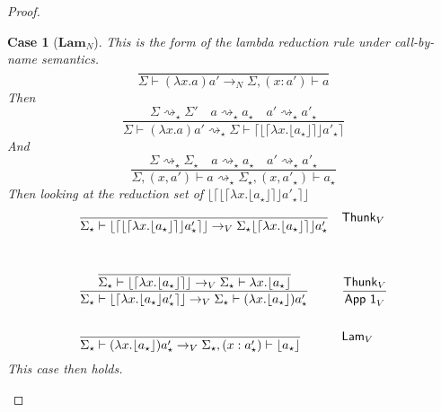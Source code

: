 \documentclass[float=false, crop=false]{standalone}
\newtheorem{case}{Case}
\numberwithin{subcase}{case}
\newcommand{\tlang}{\star}
\newcommand{\thunk}[1]{\lceil #1 \rceil}
\newcommand{\unwrap}[1]{\lfloor #1 \rfloor}
\newcommand{\tcbn}{\rightarrow_N}
\newcommand{\tcbv}{\rightarrow_V}
\newcommand{\tlthunk}{\rightsquigarrow_\tlang}
\begin{document}
\begin{proof}
  \begin{case}[$\mathbf{Lam}_N$]
    This is the form of the lambda reduction rule under call-by-name semantics.
    \[\frac{}{\Sigma \vdash (\lambda x.a)a' \tcbn \Sigma,(x:a') \vdash a }\]
    Then \[ \frac{\Sigma \tlthunk \Sigma' \quad 
        a \tlthunk a_\tlang \quad a' \tlthunk a'_\tlang}
      {\Sigma \vdash (\lambda x .a)a' 
        \tlthunk \Sigma \vdash \thunk{\unwrap{
            \thunk{\lambda x. \unwrap{ a_\tlang}}} a'_\tlang} } \]
    And \[ \frac{\Sigma \tlthunk \Sigma_\tlang \quad a 
        \tlthunk a_\tlang \quad a' \tlthunk a'_\tlang}
      {\Sigma,(x,a') \vdash a\tlthunk \Sigma_\tlang,
        (x,a'_\tlang) \vdash a_\tlang} \]
   Then looking at the reduction set of  
   ${\unwrap{\thunk{\unwrap{
        \thunk{\lambda x. \unwrap{ a_\tlang}}} a'_\tlang}}}$
    \begin{align*}
     &\frac{}{ 
       \Sigma_\tlang \vdash \unwrap{\thunk{\unwrap{\thunk{\lambda x.
               \unwrap{ a_\tlang}}} a'_\tlang}} \tcbv 
       \Sigma_\tlang \unwrap{\thunk{\lambda x.
               \unwrap{ a_\tlang}}} a'_\tlang} && \mathsf{Thunk}_V \\ \\
     &\cfrac{\cfrac{}{\Sigma_\tlang \vdash \unwrap{\thunk{\lambda x.
           \unwrap{ a_\tlang}}} \tcbv  \Sigma_\tlang \vdash \lambda x.
       \unwrap{a_\tlang}}}{ 
       \Sigma_\tlang \vdash \unwrap{\thunk{\lambda x.
               \unwrap{ a_\tlang} a'_\tlang}} \tcbv 
           \Sigma_\tlang \vdash (\lambda x.\unwrap{a_\tlang}) a'_\tlang} && 
         \frac{\mathsf{Thunk}_V}{\mathsf{App\ 1}_V}\\ \\
     &\frac{}{\Sigma_\tlang \vdash (\lambda x.\unwrap{a_\tlang})a'_\tlang \tcbv 
       \Sigma_\tlang, (x:a_\tlang') \vdash \unwrap{a_\tlang}} && \mathsf{Lam}_V
    \end{align*}
    This case then holds.
  \end{case}


\end{proof}
\end{document}
